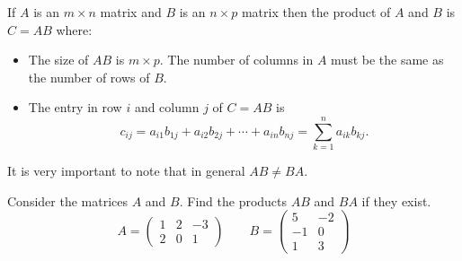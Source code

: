 \begin{definition}
    If $A$ is an $m \times n$ matrix and $B$ is an $n \times p$ matrix then the product of
    $A$ and $B$ is $C = AB$ where:
    \begin{itemize}
        \item The size of $AB$ is $m \times p$.  The number of columns in $A$ must be the
            same as the number of rows of $B$.
        \item The entry in row $i$ and column $j$ of $C = AB$ is
            \[ c_{ij} = a_{i1} b_{1j} + a_{i2}b_{2j} + \cdots + a_{in}b_{nj} =
            \sum_{k=1}^n a_{ik}b_{kj}.\]
    \end{itemize}
    It is very important to note that in general $AB \ne BA$.
\end{definition}

\begin{problem}
    Consider the matrices $A$ and $B$.  Find the products $AB$ and $BA$ if they exist.
    \[ A = \begin{pmatrix} 1 & 2 & -3 \\ 2 & 0 & 1 \end{pmatrix} \qquad B =
    \begin{pmatrix} 5 & -2 \\ -1 & 0 \\ 1 & 3 \end{pmatrix} \]
\end{problem}
\solution{
    \[ AB = \begin{pmatrix} 0 & -11 \\ 11 & -1 \end{pmatrix} \qquad BA = \begin{pmatrix} 1
        & 10 & -17 \\ -1 & -2 & 3 \\ 7 & 2 & 0 \end{pmatrix} \]
}


